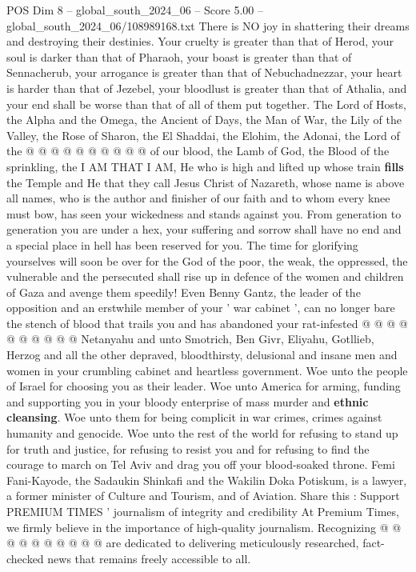 \begin{textsample}{POS Dim 8 – global\_south\_2024\_06 – Score 5.00 – global\_south\_2024\_06/108989168.txt}
There is NO joy in shattering their dreams and destroying their destinies.
Your cruelty is greater than that of Herod, your soul is darker than that of Pharaoh, your boast is greater than that of Sennacherub, your arrogance is greater than that of Nebuchadnezzar, your heart is harder than that of Jezebel, your bloodlust is greater than that of Athalia, and your end shall be worse than that of all of them put together.
The Lord of Hosts, the Alpha and the Omega, the Ancient of Days, the Man of War, the Lily of the Valley, the Rose of Sharon, the El Shaddai, the Elohim, the Adonai, the Lord of the @ @ @ @ @ @ @ @ @ @ of our blood, the Lamb of God, the Blood of the sprinkling, the I AM THAT I AM, He who is high and lifted up whose train \textbf{fills} the Temple and He that they call Jesus Christ of Nazareth, whose name is above all names, who is the author and finisher of our faith and to whom every knee must bow, has seen your wickedness and stands against you.
From generation to generation you are under a hex, your suffering and sorrow shall have no end and a special place in hell has been reserved for you.
The time for glorifying yourselves will soon be over for the God of the poor, the weak, the oppressed, the vulnerable and the persecuted shall rise up in defence of the women and children of Gaza and avenge them speedily!
Even Benny Gantz, the leader of the opposition and an erstwhile member of your ' war cabinet ', can no longer bare the stench of blood that trails you and has abandoned your rat-infested @ @ @ @ @ @ @ @ @ @ Netanyahu and unto Smotrich, Ben Givr, Eliyahu, Gotllieb, Herzog and all the other depraved, bloodthirsty, delusional and insane men and women in your crumbling cabinet and heartless government.
Woe unto the people of Israel for choosing you as their leader.
Woe unto America for arming, funding and supporting you in your bloody enterprise of mass murder and \textbf{ethnic} \textbf{cleansing}.
Woe unto them for being complicit in war crimes, crimes against humanity and genocide.
Woe unto the rest of the world for refusing to stand up for truth and justice, for refusing to resist you and for refusing to find the courage to march on Tel Aviv and drag you off your blood-soaked throne.
Femi Fani-Kayode, the Sadaukin Shinkafi and the Wakilin Doka Potiskum, is a lawyer, a former minister of Culture and Tourism, and of Aviation.
Share this : Support PREMIUM TIMES ' journalism of integrity and credibility At Premium Times, we firmly believe in the importance of high-quality journalism.
Recognizing @ @ @ @ @ @ @ @ @ @ are dedicated to delivering meticulously researched, fact-checked news that remains freely accessible to all.

\end{textsample}
